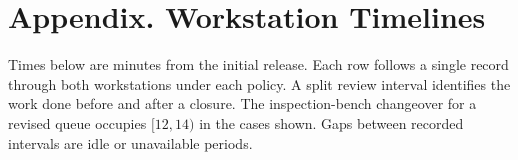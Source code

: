 \documentclass{swmcmthesis}
\begin{document}
\section*{Appendix. Workstation Timelines}
Times below are minutes from the initial release. Each row follows a single record through both workstations under each policy. A split review interval identifies the work done before and after a closure. The inspection-bench changeover for a revised queue occupies \([12,14)\) in the cases shown. Gaps between recorded intervals are idle or unavailable periods.
\AuditAppendix
\end{document}
